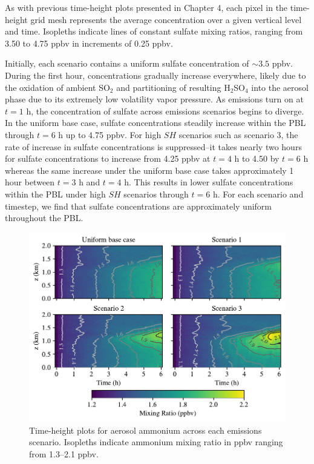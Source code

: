 As with previous time-height plots presented in Chapter 4, each pixel in the time-height grid mesh represents the average concentration over a given vertical level and time. Isopleths indicate lines of constant sulfate mixing ratios, ranging from 3.50 to 4.75 ppbv in increments of 0.25 ppbv.

Initially, each scenario contains a uniform sulfate concentration of $\sim3.5$ ppbv. During the first hour, concentrations gradually increase everywhere, likely due to the oxidation of ambient SO$_2$ and partitioning of resulting H$_2$SO$_4$ into the aerosol phase due to its extremely low volatility vapor pressure. As emissions turn on at $t=1$ h, the concentration of sulfate across emissions scenarios begins to diverge. In the uniform base case, sulfate concentrations steadily increase within the PBL through $t=6$ h up to 4.75 ppbv. For high $SH$ scenarios such as scenario 3, the rate of increase in sulfate concentrations is suppressed--it takes nearly two hours for sulfate concentrations to increase from 4.25 ppbv at $t=4$ h to 4.50 by $t=6$ h whereas the same increase under the uniform base case takes approximately 1 hour between $t=3$ h and $t=4$ h. This results in lower sulfate concentrations within the PBL under high $SH$ scenarios through $t=6$ h. For each scenario and timestep, we find that sulfate concentrations are approximately uniform throughout the PBL. 

\begin{figure}[!t]
  \centering
    \includegraphics[width=\textwidth]{figures/chapter5/height-time-pmc_NH4-four-scenarios.pdf}
    \caption{Time-height plots for aerosol ammonium across each emissions scenario. Isopleths indicate ammonium mixing ratio in ppbv ranging from 1.3--2.1 ppbv.}
    \label{fig:ht-nh4}
\end{figure}

